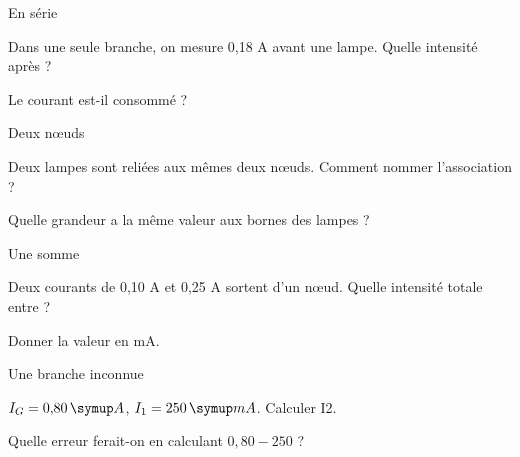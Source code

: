 \par\noindent\begin{minipage}{\linewidth}
\begin{exercice}[1]{En série}
\begin{questions}
\item Dans une seule branche, on mesure 0,18 A avant une lampe. Quelle intensité après ?
\item Le courant est-il consommé ?
\end{questions}
\end{exercice}
\end{minipage}
\par\noindent\begin{minipage}{\linewidth}
\begin{exercice}[1]{Deux nœuds}
\begin{questions}
\item Deux lampes sont reliées aux mêmes deux nœuds. Comment nommer l’association ?
\item Quelle grandeur a la même valeur aux bornes des lampes ?
\end{questions}
\end{exercice}
\end{minipage}
\par\noindent\begin{minipage}{\linewidth}
\begin{exercice}[1]{Une somme}
\begin{questions}
\item Deux courants de 0,10 A et 0,25 A sortent d’un nœud. Quelle intensité totale entre ?
\item Donner la valeur en mA.
\end{questions}
\end{exercice}
\end{minipage}
\clearpage{}
\par\noindent\begin{minipage}{\linewidth}
\begin{exercice}[2]{Une branche inconnue}
\begin{questions}
\item $I_G=0{,}80\unite A$, $I_1=250\unite{mA}$. Calculer I2.
\item Quelle erreur ferait-on en calculant $0{,}80-250$ ?
\end{questions}
\end{exercice}
\end{minipage}
